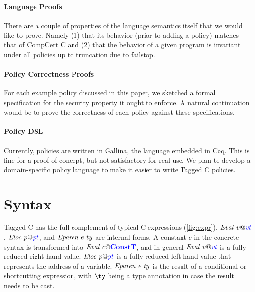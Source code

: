 \documentclass{llncs}
\begin{document}
\paragraph{Language Proofs}

There are a couple of properties of the language semantics itself that we would like to prove.
Namely (1) that its behavior (prior to adding a policy) matches that of CompCert C and
(2) that the behavior of a given program is invariant under all policies up to truncation due
to failstop.

\paragraph{Policy Correctness Proofs}

For each example policy discussed in this paper, we sketched a formal specification for the
security property it ought to enforce. A natural continuation would be to prove the correctness
of each policy against these specifications.

\paragraph{Policy DSL}

Currently, policies are written in Gallina, the language embedded in Coq. This is fine for a
proof-of-concept, but not satisfactory for real use. We plan to develop a domain-specific policy
language to make it easier to write Tagged C policies.




\appendix

\section{Syntax}

Tagged C has the full complement of typical C expressions (\cref{fig:expr}). \(\mathit{Eval} ~ v@\mathit{\color{blue} vt}\),
\(\mathit{Eloc} ~ p@\mathit{\color{blue} pt}\), and \(\mathit{Eparen} ~ e ~ ty\) are internal forms.
A constant \(c\) in the concrete syntax is transformed into \(\mathit{Eval} ~ c@\color{blue} \mathbf{ConstT}\),
and in general \(\mathit{Eval} ~ v@\mathit{\color{blue} vt}\) is a fully-reduced right-hand value. \(\mathit{Eloc} ~ p@\mathit{\color{blue} pt}\)
is a fully-reduced left-hand value that represents the address of a variable.
\(\mathit{Eparen} ~ e ~ ty\) is the result of a conditional or shortcutting
expression, with \(\ty\) being a type annotation in case the result needs to
be cast.
\end{document}
